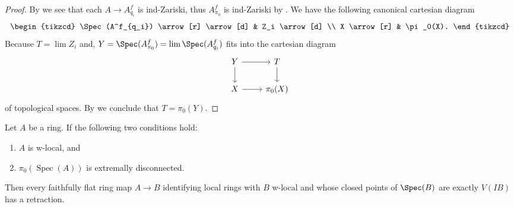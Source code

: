 \begin{proof}
  By  we see that each \(A \to A^f_{q_i}\) is ind-Zariski, thus $A^f_{\pi_0}$ is ind-Zariski by . We have the following canonical cartesian diagram
  \[
  \begin{tikzcd}
  \Spec (A^f_{q_i}) \arrow[r] \arrow[d] & Z_i \arrow[d] \\
  X \arrow[r] & \pi_0(X).
  \end{tikzcd}
  \]
  Because $T = \lim Z_i$ and, $Y = \Spec (A^f_{\pi_0}) = \lim \Spec (A^f_{q_i})$ fits into the cartesian diagram
  \[
  \begin{tikzcd}
  Y \arrow[r] \arrow[d] & T \arrow[d] \\
  X \arrow[r] & \pi_0(X)
  \end{tikzcd}
  \]
  of topological spaces. By  we conclude that $T = \pi_0(Y)$.
\end{proof}

\begin{lemma}
  \label{thm:ff-identifies-local-rings-plus-c-has-retraction-if}
  Let $A$ be a ring. If the following two conditions hold:
  \begin{enumerate}
    \item $A$ is w-local, and
    \item $\pi_0(\operatorname{Spec}(A))$ is extremally disconnected.
  \end{enumerate}
  Then every faithfully flat ring map $A \to B$ identifying local rings with \(B\) w-local and whose closed points of \(\Spec (B)\) are exactly \(V(IB)\) has a retraction.
\end{lemma}

